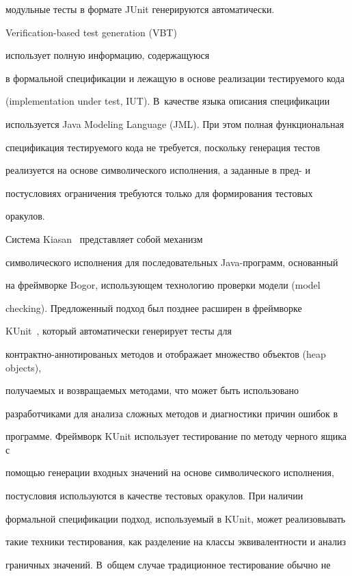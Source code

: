 модульные тесты в формате JUnit генерируются автоматически.


Verification-based test generation (VBT)


использует полную информацию, содержащуюся


в формальной спецификации и лежащую в основе реализации тестируемого кода


(implementation under test, IUT). В~качестве языка описания спецификации


используется Java Modeling Language (JML). При этом полная функциональная


спецификация тестируемого кода не требуется, поскольку генерация тестов


реализуется на основе символического исполнения, а заданные в пред- и


постусловиях ограничения требуются только для формирования тестовых


оракулов.





Система Kiasan~\cite{12-andr, 9-andr} представляет собой механизм


символического исполнения для последовательных Java-про\-грамм, основанный


на фреймворке Bogor, использующем технологию проверки модели (model


checking). Предложенный подход был позднее расширен в фреймворке


KUnit~\cite{9-andr}, который автоматически генерирует тесты для


контрактно-аннотированых методов и отображает множество объектов (heap objects),


получаемых и возвращаемых методами, что может быть использовано


разработчиками для анализа сложных методов и диагностики причин ошибок в


программе. Фреймворк KUnit использует тестирование по методу черного ящика с


помощью генерации входных значений на основе символического исполнения,


постусловия используются в качестве тестовых оракулов. При наличии


формальной спецификации подход, используемый в KUnit, может реализовывать


такие техники тестирования, как разделение на классы эквивалентности и анализ


граничных значений. В~общем случае традиционное тестирование обычно не


